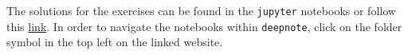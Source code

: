 \documentclass[a4paper]{article}
\begin{document}

The solutions for the exercises can be found in the \texttt{jupyter} notebooks or follow this \href{https://deepnote.com/project/ex-fi-sol-JJ0bjhCfS5Sw7-1dIhcbKA/\%2Fex-fi-pfi-sol.ipynb}{link}. In order to navigate the notebooks within \texttt{deepnote}, click on the folder symbol in the top left on the linked website.


%



%


\dlz
\end{document}
